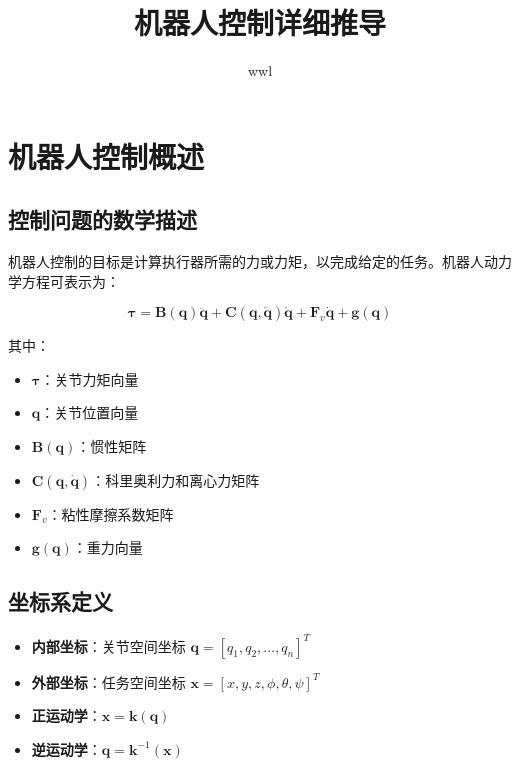 \documentclass[12pt,a4paper]{article}
\title{\textbf{机器人控制详细推导}}
\author{wwl}
\date{}
\begin{document}
\maketitle

\section{机器人控制概述}

\subsection{控制问题的数学描述}

机器人控制的目标是计算执行器所需的力或力矩，以完成给定的任务。机器人动力学方程可表示为：

\begin{equation}
\boldsymbol{\tau} = \mathbf{B}(\mathbf{q})\ddot{\mathbf{q}} + \mathbf{C}(\mathbf{q},\dot{\mathbf{q}})\dot{\mathbf{q}} + \mathbf{F}_v\dot{\mathbf{q}} + \mathbf{g}(\mathbf{q})
\label{eq:robot_dynamics}
\end{equation}

其中：
\begin{itemize}
    \item $\boldsymbol{\tau}$：关节力矩向量
    \item $\mathbf{q}$：关节位置向量
    \item $\mathbf{B}(\mathbf{q})$：惯性矩阵
    \item $\mathbf{C}(\mathbf{q},\dot{\mathbf{q}})$：科里奥利力和离心力矩阵
    \item $\mathbf{F}_v$：粘性摩擦系数矩阵
    \item $\mathbf{g}(\mathbf{q})$：重力向量
\end{itemize}

\subsection{坐标系定义}

\begin{itemize}
    \item \textbf{内部坐标}：关节空间坐标 $\mathbf{q} = [q_1, q_2, \dots, q_n]^T$
    \item \textbf{外部坐标}：任务空间坐标 $\mathbf{x} = [x, y, z, \phi, \theta, \psi]^T$
    \item \textbf{正运动学}：$\mathbf{x} = \mathbf{k}(\mathbf{q})$
    \item \textbf{逆运动学}：$\mathbf{q} = \mathbf{k}^{-1}(\mathbf{x})$
\end{itemize}
\end{document}
